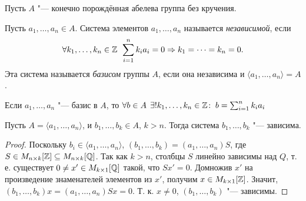 \documentclass[main]{subfiles}
\begin{document}
Пусть \( A \) "--- конечно порождённая абелева группа без кручения.

\begin{definition}
  Пусть \( a_1, \dots, a_n \in A \).
  Система элементов \( a_1, \dots, a_n \) называется
  \emph{независимой}, если
  \[
    \forall {k_1, \dots, k_n \in \mathbb{Z}} \; \,
    \sum_{i = 1}^n k_i a_i = 0 \Rightarrow k_1 = \dots = k_n = 0.
  \]
  Эта система называется \emph{базисом} группы \( A \),
  если она независима
  и \( \langle a_1, \dots, a_n \rangle = A \).
\end{definition}
\begin{remark}
  Если \( a_1, \dots, a_n \) "--- базис в \( A \),
  то
  \( \forall {b \in A} \; \,
  \exists! k_1, \dots, k_n \in \mathbb{Z} \colon \:
  b = \sum_{i = 1}^n k_i a_i
  \)
\end{remark}

\begin{lemma}
  Пусть \( A = \langle a_1, \dots, a_n \rangle \),
  и \( b_1, \dots, b_k \in A \), \( k > n \).
  Тогда система \( b_1, \dots, b_k \) "--- зависима.
\end{lemma}
\begin{proof}
  Поскольку \( b_i \in \langle a_1, \dots, a_n \rangle \),
  \( (b_1, \dots, b_k) = ( a_1, \dots, a_n) S \),
  где \( S \in \Matrices{n}{k}[\Integer] \subseteq
  \Matrices{n}{k}[\Rational] \).
  Так как \( k > n \), столбцы \( S \) линейно зависимы
  над \( Q \), т. е.
  существует \( 0 \ne x' \in \Matrices{k}{1}[\Rational] \)
  такой, что \( S x' = 0 \).
  Домножив \( x' \) на произведение знаменателей элементов
  из \( x' \), получим \( x \in \Matrices{k}{1}[\Integer] \).
  Значит, \( (b_1, \dots, b_k) x = (a_1, \dots, a_n)Sx = 0 \).
  Т. к. \( x \ne 0 \), \( (b_1, \dots, b_k) \) "--- зависимы.
\end{proof}
\end{document}
